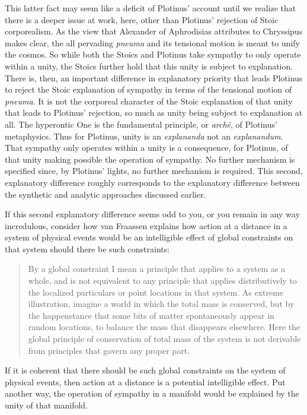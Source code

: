 This latter fact may seem like a deficit of Plotinus' account until we realize that there is a deeper issue at work, here, other than Plotinus' rejection of Stoic corporealism. As the view that Alexander of Aphrodisias attributes to Chryssipus makes clear, the all pervading \emph{pneuma} and its tensional motion is meant to unify the cosmos. So while both the Stoics and Plotinus take sympathy to only operate within a unity, the Stoics further hold that this unity is subject to explanation. There is, then, an important difference in explanatory priority that leads Plotinus to reject the Stoic explanation of sympathy in terms of the tensional motion of \emph{pneuma}. It is not the corporeal character of the Stoic explanation of that unity that leads to Plotinus' rejection, so much as unity being subject to explanation at all. The hyperontic One is the fundamental principle, or \emph{arch\'{e}}, of Plotinus' metaphysics. Thus for Plotinus, unity is an \emph{explananda} not an \emph{explanandum}. That sympathy only operates within a unity is a consequence, for Plotinus, of that unity making possible the operation of sympathy. No further mechanism is specified since, by Plotinus' lights, no further mechanism is required. This second, explanatory difference roughly corresponds to the explanatory difference between the synthetic and analytic approaches discussed earlier.

If this second explanatory difference seems odd to you, or you remain in any way incredulous, consider how van Fraassen explains how action at a distance in a system of physical events would be an intelligible effect of global constraints on that system should there be such constraints:
\begin{quote}
	By a global constraint I mean a principle that applies to a system as a whole, and is not equivalent to any principle that applies distributively to the localized particulars or point locations in that system. As extreme illustration, imagine a world in which the total mass is conserved, but by the happenstance that some bits of matter spontaneously appear in random locations, to balance the mass that disappears elsewhere. Here the global principle of conservation of total mass of the system is not derivable from principles that govern any proper part. \citep[3]{Fraassen:1989ao}
\end{quote}
If it is coherent that there should be such global constraints on the system of physical events, then action at a distance is a potential intelligible effect. Put another way, the operation of sympathy in a manifold would be explained by the unity of that manifold.


